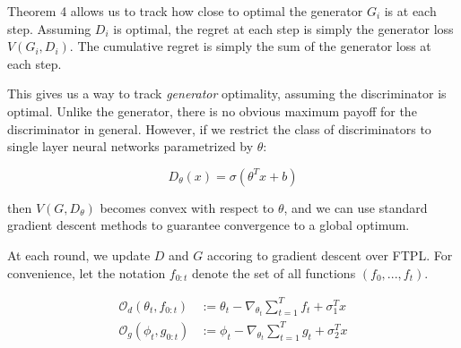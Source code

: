 \documentclass[]{article}
\theoremstyle{definition}
\begin{document}
Theorem 4 allows us to track how close to optimal the generator $G_i$ is at each step. Assuming $D_i$ is optimal, the regret at each step is simply the generator loss $V(G_i, D_i)$. The cumulative regret is simply the sum of the generator loss at each step. 

This gives us a way to track \emph{generator} optimality, assuming the discriminator is optimal. Unlike the generator, there is no obvious maximum payoff for the discriminator in general. 
However, if we restrict the class of discriminators to single layer neural networks parametrized by $\theta$:

\begin{equation}
    D_\theta(x) = \sigma(\theta^Tx + b)
\end{equation}

then $V(G, D_\theta)$ becomes convex with respect to $\theta$, and we can use standard gradient descent methods to guarantee convergence to a global optimum. 

At each round, we update $D$ and $G$ accoring to gradient descent over FTPL. For convenience, let the notation $f_{0:t}$ denote the set of all functions $(f_0,...,f_t)$.

\begin{align}
     \mathcal{O}_d(\theta_t, f_{0:t}) &:= \theta_t - \nabla_{\theta_t} \sum_{t=1}^T f_t + \sigma_1^Tx \\
 \mathcal{O}_g(\phi_t, g_{0:t}) &:= \phi_t - \nabla_{\theta_t} \sum_{t=1}^T g_t + \sigma_2^Tx 
\end{align}
\end{document}
